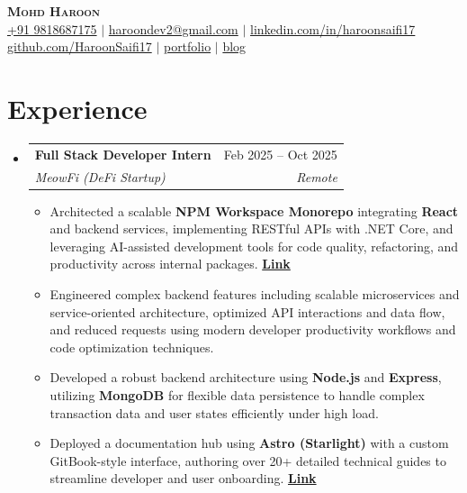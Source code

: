\documentclass[letterpaper,11pt]{article}
\makeatletter
\newcommand{\resumeItem}[1]{
  \item\small{
    {#1 \vspace{-2pt}}
  }
}
\newcommand{\resumeSubheading}[4]{
  \vspace{-2pt}\item
    \begin{tabular*}{0.97\textwidth}[t]{l@{\extracolsep{\fill}}r}
      \textbf{#1} & #2 \\
      \textit{\small#3} & \textit{\small #4} \\
    \end{tabular*}\vspace{-7pt}
}
\newcommand{\resumeSubHeadingListStart}{\begin{itemize}[leftmargin=0.15in, label={}]}
\newcommand{\resumeSubHeadingListEnd}{\end{itemize}}
\newcommand{\resumeItemListStart}{\begin{itemize}}
\newcommand{\resumeItemListEnd}{\end{itemize}\vspace{-5pt}}
\makeatother
\begin{document}
\begin{center}
    \textbf{\Huge \scshape Mohd Haroon} \\ \vspace{3pt}
    \small \href{tel:+919818687175}{+91 9818687175} $|$
    \href{mailto:haroondev2@gmail.com}{haroondev2@gmail.com} $|$
    \href{https://linkedin.com/in/haroonsaifi17}{linkedin.com/in/haroonsaifi17} \\ \vspace{2pt}
    \href{https://github.com/HaroonSaifi17}{github.com/HaroonSaifi17} $|$
    \href{https://portfolio-v4-roan.vercel.app/}{portfolio} $|$
    \href{https://portfolio-v4-roan.vercel.app/blog}{blog}
\end{center}

\vspace{-1.5em}

\section{Experience}
  \resumeSubHeadingListStart

    \resumeSubheading
      {Full Stack Developer Intern}{Feb 2025 -- Oct 2025}
      {MeowFi (DeFi Startup)}{Remote}
    \resumeItemListStart
        \resumeItem{Architected a scalable \textbf{NPM Workspace Monorepo} integrating \textbf{React} and backend services, implementing RESTful APIs with .NET Core, and leveraging AI-assisted development tools for code quality, refactoring, and productivity across internal packages. \hfill \href{https://portfolio-v4-roan.vercel.app/case-studies/meowfi-dapp}{\textbf{Link}}}
        \resumeItem{Engineered complex backend features including scalable microservices and service-oriented architecture, optimized API interactions and data flow, and reduced requests using modern developer productivity workflows and code optimization techniques.}
        \resumeItem{Developed a robust backend architecture using \textbf{Node.js} and \textbf{Express}, utilizing \textbf{MongoDB} for flexible data persistence to handle complex transaction data and user states efficiently under high load.}
        \resumeItem{Deployed a documentation hub using \textbf{Astro (Starlight)} with a custom GitBook-style interface, authoring over 20+ detailed technical guides to streamline developer and user onboarding. \hfill \href{https://docs.meowfi.xyz}{\textbf{Link}}}
    \resumeItemListEnd

  \resumeSubHeadingListEnd
\end{document}
